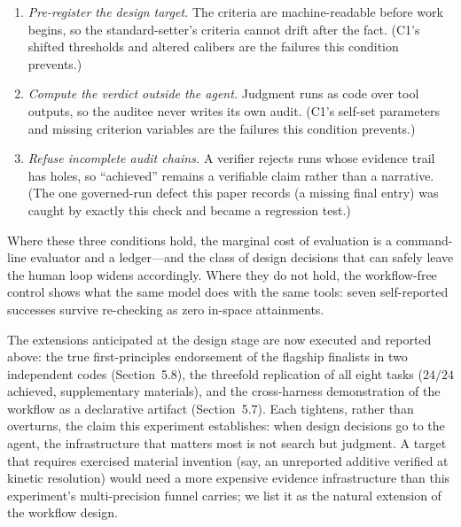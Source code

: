 \begin{enumerate}
\item \emph{Pre-register the design target.} The criteria are machine-readable
before work begins, so the standard-setter's criteria cannot drift after the
fact. (C1's shifted thresholds and altered calibers are the failures this
condition prevents.)
\item \emph{Compute the verdict outside the agent.} Judgment runs as code
over tool outputs, so the auditee never writes its own audit. (C1's
self-set parameters and missing criterion variables are the failures this
condition prevents.)
\item \emph{Refuse incomplete audit chains.} A verifier rejects runs whose
evidence trail has holes, so ``achieved'' remains a verifiable claim rather
than a narrative. (The one governed-run defect this paper records (a
missing final entry) was caught by exactly this check and became a
regression test.)
\end{enumerate}

Where these three conditions hold, the marginal cost of evaluation is a
command-line evaluator and a ledger---and the class of design decisions that
can safely leave the human loop widens accordingly. Where they do not hold,
the workflow-free control shows what the same model does with the same
tools: seven self-reported successes survive re-checking as zero
in-space attainments.

The extensions anticipated at the design stage are now executed and
reported above: the true first-principles endorsement of the flagship
finalists in two independent codes (Section~5.8), the threefold replication
of all eight tasks ($24/24$ achieved, supplementary materials), and the
cross-harness demonstration of the workflow as a declarative artifact
(Section~5.7). Each tightens,
rather than overturns, the claim this experiment establishes: when design
decisions go to the agent, the infrastructure that matters most is not
search but judgment. A target that requires exercised
material invention (say, an unreported additive verified at kinetic
resolution) would need a more expensive evidence infrastructure than this
experiment's multi-precision funnel carries; we list it as the natural
extension of the workflow design.
